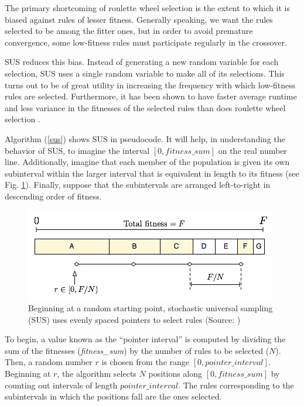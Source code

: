 \documentclass[11pt]{article}
\begin{document}
The primary shortcoming of roulette wheel selection is the extent to which it is biased against rules of lesser fitness. Generally speaking, we want the rules selected to be among the fitter ones, but in order to avoid premature convergence, some low-fitness rules must participate regularly in the crossover.

SUS reduces this bias. Instead of generating a new random variable for each selection, SUS uses a single random variable to make all of its selections. This turns out to be of great utility in increasing the frequency with which low-fitness rules are selected.
Furthermore, it has been shown to have faster average runtime and less variance in the fitnesses of the selected rules than does roulette wheel selection \cite{tobias_blickle_comparison_1995}.

Algorithm (\ref{sus}) shows SUS in pseudocode. It will help, in understanding the behavior of SUS, to imagine the interval $[0, fitness\_sum]$ on the real number line. Additionally, imagine that each member of the population is given its own subinterval within the larger interval that is equivalent in length to its fitness (see Fig. \ref{sus_graphic}). Finally, suppose that the subintervals are arranged left-to-right in descending order of fitness. 

\begin{figure}[h]
\centering
\includegraphics[scale=0.6]{images/sus.png}
\caption{Beginning at a random starting point, stochastic universal sampling (SUS) uses evenly spaced pointers to select rules (Source: \cite{assumed_diagram_2007})}
\label{sus_graphic}
\end{figure}

To begin, a value known as the ``pointer interval'' is computed by dividing the sum of the fitnesses (\emph{fitness\_sum}) by the number of rules to be selected ($N$). Then, a random number $r$ is chosen from the range $[0, pointer\_interval]$. Beginning at $r$, the algorithm selects $N$ positions along $[0, fitness\_sum]$ by counting out intervals of length $pointer\_interval$. The rules corresponding to the subintervals in which the positions fall are the ones selected.
\end{document}
